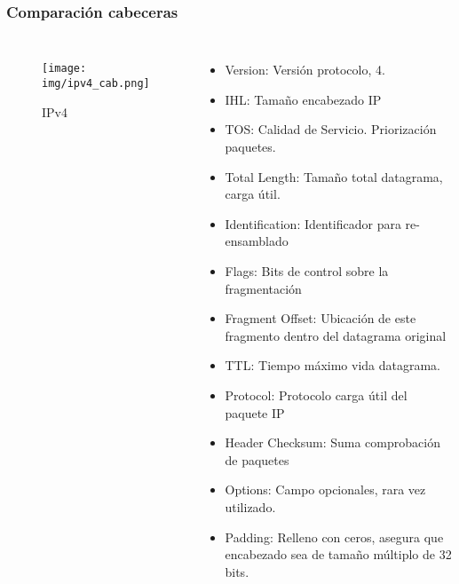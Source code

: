 \documentclass{beamer}
\begin{document}
\begin{frame}
  \frametitle{Comparación cabeceras}
  \begin{columns}[t]
    	\begin{figure}
		\centering
		\texttt{[image: img/ipv4\_cab.png]}
		\caption{IPv4}
	\end{figure}
	 \begin{itemize}
		\tiny 
		\item
			Version: Versión protocolo, 4.
		\item
			IHL: Tamaño encabezado IP
		\item
			TOS: Calidad de Servicio. Priorización paquetes.
		\item
			Total Length: Tamaño total datagrama, carga útil.
		\item
			Identification: Identificador para re-ensamblado
		\item
			Flags: Bits de control sobre la fragmentación
		\item
			Fragment Offset: Ubicación de este fragmento dentro
			del datagrama original
		\item
			TTL: Tiempo máximo vida datagrama.
		\item
			Protocol: Protocolo carga útil del paquete IP
		\item
			Header Checksum: Suma comprobación de paquetes
		\item
			Options: Campo opcionales, rara vez utilizado.
		\item
			Padding: Relleno con ceros, asegura que
			encabezado sea de tamaño múltiplo de 32 bits.
	 \end{itemize}
  \end{columns}
\end{frame}
\end{document}
